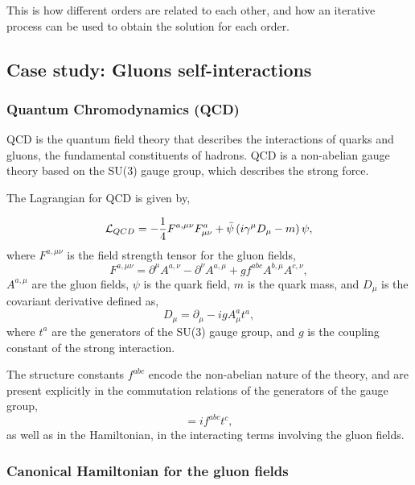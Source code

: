 \documentclass[11pt,a4paper,twoside,pdf]{article}
\numberwithin{equation}{section}
\begin{document}
This is how different orders are related to each other, and how an iterative 
process can be used to obtain the solution for each order.

\subsection{Case study: Gluons self-interactions} \label{sec:cases}

\subsubsection{Quantum Chromodynamics (QCD)}
QCD is the quantum field theory that describes the
interactions of quarks and gluons, the fundamental constituents of hadrons.
QCD is a non-abelian gauge theory based on the SU(3) gauge group, which describes
the strong force.

The Lagrangian for QCD is given by,

\begin{equation}
    \mathcal{L}_{QCD} = -\frac{1}{4} F^{a,\mu\nu} F^a_{\mu\nu} + \bar{\psi}
    \left( i\gamma^\mu D_\mu - m \right) \psi,
\label{eq:qcd_lagrangian}
\end{equation}
where \( F^{a,\mu\nu} \) is the field strength tensor for the gluon fields,
\begin{equation}
    F^{a,\mu\nu} = \partial^\mu A^{a,\nu} - \partial^\nu A^{a,\mu} + g f^{abc} A^{b,\mu} A^{c,\nu},
\end{equation}
\( A^{a,\mu} \) are the gluon fields, \( \psi \) is the quark field, \( m \) is the quark mass,
and \( D_\mu \) is the covariant derivative defined as,
\begin{equation}
    D_\mu = \partial_\mu - ig A^a_\mu t^a,
\end{equation}
where \( t^a \) are the generators of the SU(3) gauge group, and \( g \) is the
coupling constant of the strong interaction.

The structure constants \( f^{abc} \) encode the non-abelian nature of the
theory, and are present explicitly in the commutation relations of the
generators of the gauge group,
\begin{equation}
    [t^a, t^b] = i f^{abc} t^c,
\end{equation}
as well as in the Hamiltonian, in the interacting terms involving the gluon fields.

\subsubsection{Canonical Hamiltonian for the gluon fields}
\end{document}
